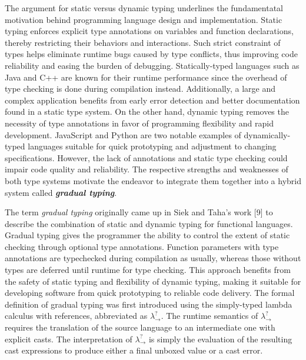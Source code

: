 The argument for static versus dynamic typing underlines the fundamentatal 
motivation behind programming language design and implementation. Static 
typing enforces explicit type annotations on variables and function 
declarations, thereby restricting their behaviors and interactions. 
Such strict constraint of types helps eliminate runtime bugs caused 
by type conflicts, thus improving code reliability and easing the 
burden of debugging. Statically-typed languages such as Java 
and C++ are known for their runtime performance since the overhead of 
type checking is done during compilation instead. Additionally, a large 
and complex application benefits from early error detection and better 
documentation found in a static type system. On the other hand, dynamic typing 
removes the necessity of type annotations in favor of programming 
flexibility and rapid development. JavaScript and Python are two notable 
examples of dynamically-typed languages suitable for quick prototyping 
and adjustment to changing specifications. However, the lack of 
annotations and static type checking could impair code quality and 
reliability. The respective strengths and 
weaknesses of both type systems motivate the endeavor to integrate them 
together into a hybrid system called \textit{\textbf{gradual typing}}. 

The term \textit{gradual typing} originally came up in Siek and 
Taha's work [9] to describe the combination of static and dynamic typing 
for functional languages. Gradual typing gives the programmer the ability 
to control the extent of static checking through optional type annotations. 
Function parameters with type annotations are typechecked during 
compilation as usually, whereas those without types are deferred until 
runtime for type checking. This approach benefits from the safety of static 
typing and flexibility of dynamic typing, making it suitable for developing 
software from quick prototyping to reliable code delivery. The formal 
definition of gradual typing was first introduced using the 
simply-typed lambda calculus with references, abbreviated as $\lambda ^? _{\rightarrow}$. 
The runtime semantics of $\lambda ^? _{\rightarrow}$ requires the 
translation of the source language to an intermediate one with explicit 
casts. The interpretation of $\lambda ^? _{\rightarrow}$ 
is simply the evaluation of the resulting cast expressions to produce 
either a final unboxed value or a cast error.

